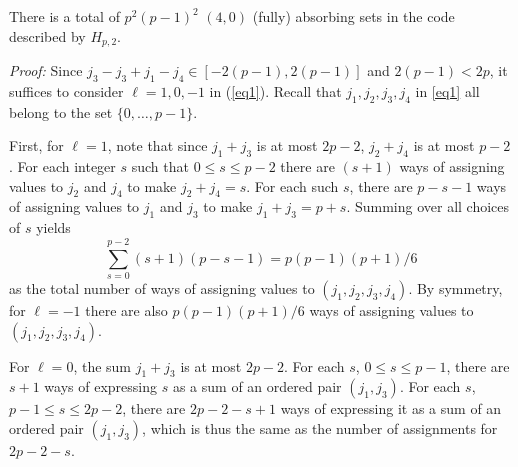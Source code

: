


\begin{lemma}\label{lemma40} There is a total of $p^2(p-1)^2$ $(4,0)$ (fully) absorbing sets in
the code described by $H_{p,2}$.
\end{lemma}
\noindent \textit{Proof:} Since $j_3-j_3+j_1-j_4 \in [-2(p-1),
2(p-1)]$ and $2(p-1)<2p$, it suffices to consider $\ell=1,0,-1$ in
(\ref{eq1}). Recall that $j_1,j_2,j_3,j_4$ in \eqref{eq1} all belong
to the set $\{0,\dots,p-1\}$.

First, for $\ell=1$, note that since $j_1+j_3$ is at most $2p-2$,
 $j_2+j_4$ is at most $p-2$. For each integer $s$ such that $0 \leq s \leq p-2$ there are
$(s+1)$ ways of assigning values to $j_2$ and $j_4$ to make
$j_2+j_4=s$. For each such $s$, there are $p-s-1$ ways of assigning
values to $j_1$ and $j_3$ to make $j_1+j_3=p+s$. Summing over all
choices of $s$ yields
\begin{equation}\label{sum401}\sum_{s=0}^{p-2}
(s+1)(p-s-1)=p(p-1)(p+1)/6\end{equation} as the total number of ways
of assigning values to $(j_1,j_2,j_3,j_4)$. By symmetry, for
$\ell=-1$ there are also $p(p-1)(p+1)/6$ ways of assigning values to
$(j_1,j_2,j_3,j_4)$.

For $\ell=0$, the sum $j_1+j_3$ is at most $2p-2$. For each $s$,
$0 \leq s \leq p-1$, there are $s+1$ ways of expressing $s$ as a
sum of an ordered pair $(j_1,j_3)$. For each $s$, $p-1 \leq s \leq
2p-2$, there are $2p-2-s+1$ ways of expressing it as a sum of an
ordered pair $(j_1,j_3)$, which is thus the same as the number of
assignments for $2p-2-s$.

